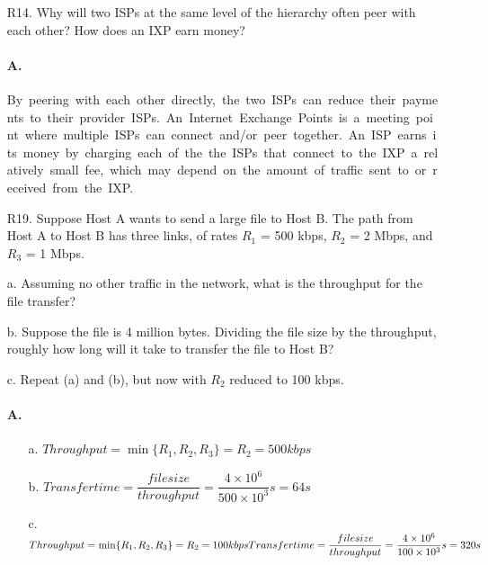 \documentclass[]{article}
\begin{document}
\begin{enumerate}
\begin{itemize}
\begin{adjustwidth}{0.3cm}{0cm}
\begin{enumerate}
				\item The sequence of message the receiving host gets will keep the same as it being sent.
			\end{enumerate}
		\end{adjustwidth}
	
		\item As for the advantage TDM has over FDM, it is obvious that TDM can \textbf{support many more users} one time than FDM can.
	\end{itemize}
	
	\item[R14.]
	Why will two ISPs at the same level of the hierarchy often peer with each
	other? How does an IXP earn money?
	
	\paragraph{A.}
	By peering with each other directly, the two ISPs can reduce their payments to their provider ISPs. An Internet Exchange Points is a meeting point where multiple ISPs can connect and/or peer together. An ISP earns its money by charging each of the the ISPs that connect to the IXP a relatively small fee, which may depend on the amount of traffic sent to or received from the IXP. 
	
	\item[R19.]
	Suppose Host A wants to send a large file to Host B. The path from Host A to
	Host B has three links, of rates $R_{1}$ = 500 kbps, $R_{2}$ = 2 Mbps, and $R_{3}$ = 1 Mbps.
	
	a. Assuming no other traffic in the network, what is the throughput for the
	file transfer?
	
	b. Suppose the file is 4 million bytes. Dividing the file size by the throughput,
	roughly how long will it take to transfer the file to Host B?
	
	c. Repeat (a) and (b), but now with $R_{2}$ reduced to 100 kbps.
	
	\paragraph{A.}
	\begin{enumerate}
		\item[a.] $Throughput =  \min\{R_{1}, R_{2}, R_{3}\} = R_{2} = 500 kbps $
		\item[b.] $Transfer time = \dfrac{file size}{throughput} = \dfrac{4 \times 10^{6}}{500 \times 10^{3}}s = 64 s$
		\item[c.] $Throughput = \min\{R_{1}, R_{2}, R_{3}\} = R_{2} = 100 kbps
		\\
		Transfer time = \dfrac{file size}{throughput} = \dfrac{4 \times 10^{6}}{100 \times 10^{3}}s = 320 s$
	\end{enumerate}
		

\end{enumerate}
\end{document}
